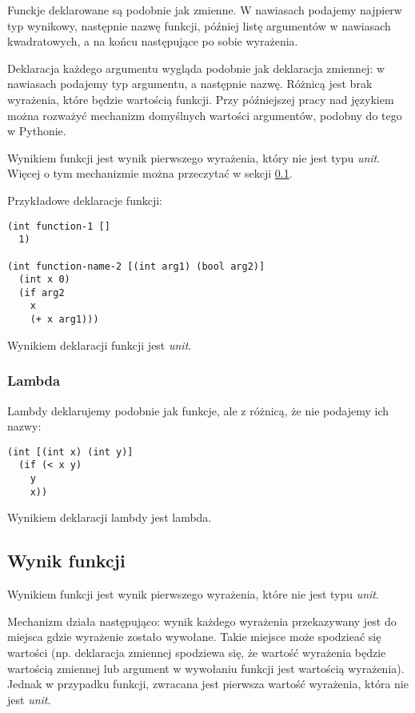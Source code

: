 \documentclass{article}
\begin{document}
Funckje deklarowane są podobnie jak zmienne. W nawiasach podajemy najpierw typ wynikowy, następnie nazwę funkcji, później listę argumentów w nawiasach kwadratowych, a na końcu następujące po sobie wyrażenia.

Deklaracja każdego argumentu wygląda podobnie jak deklaracja zmiennej: w nawiasach podajemy typ argumentu, a następnie nazwę. Różnicą jest brak wyrażenia, które będzie wartością funkcji. Przy późniejszej pracy nad językiem można rozważyć mechanizm domyślnych wartości argumentów, podobny do tego w Pythonie.

Wynikiem funkcji jest wynik pierwszego wyrażenia, który nie jest typu \textit{unit}. Więcej o tym mechanizmie można przeczytać w sekcji \ref{func:result}.

Przykładowe deklaracje funkcji:

\begin{lstlisting}
(int function-1 []
  1)

(int function-name-2 [(int arg1) (bool arg2)]
  (int x 0)
  (if arg2
    x
    (+ x arg1)))
\end{lstlisting}

Wynikiem deklaracji funkcji jest \textit{unit}.

\subsubsection{Lambda}

Lambdy deklarujemy podobnie jak funkcje, ale z różnicą, że nie podajemy ich nazwy:

\begin{lstlisting}
(int [(int x) (int y)]
  (if (< x y)
    y
    x))
\end{lstlisting}

Wynikiem deklaracji lambdy jest lambda.

\subsection{Wynik funkcji}\label{func:result}

Wynikiem funkcji jest wynik pierwszego wyrażenia, które nie jest typu \textit{unit}.

Mechanizm działa następująco: wynik każdego wyrażenia przekazywany jest do miejsca gdzie wyrażenie zostało wywołane. Takie miejsce może spodzieać się wartości (np. deklaracja zmiennej spodziewa się, że wartość wyrażenia będzie wartością zmiennej lub argument w wywołaniu funkcji jest wartością wyrażenia). Jednak w przypadku funkcji, zwracana jest pierwsza wartość wyrażenia, która nie jest \textit{unit}.
\end{document}
